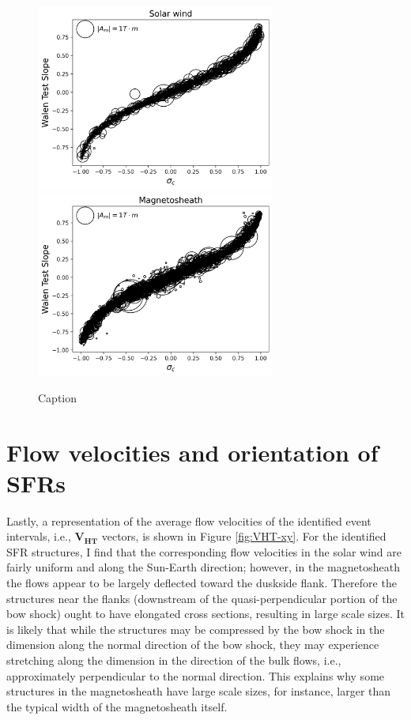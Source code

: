 \begin{figure}
    \centering
    \includegraphics[width=0.7\textwidth]{Figures/GS analysis/walenTest_vs_crosshelicity_solarwind.png}
    \includegraphics[width=0.7\textwidth]{Figures/GS analysis/walenTest_vs_crosshelicity_magnetosheath.png}
    \caption[Wal\'en test slope vs. reduced cross helicity]{Caption}
    \label{fig:walen-crosshelicity}
\end{figure}

\section{Flow velocities and orientation of SFRs}
Lastly, a representation of the average flow velocities of the identified event intervals, i.e., $\mathbf{V_{HT}}$ vectors, is shown in Figure \ref{fig:VHT-xy}. For the identified SFR structures, I find that the corresponding flow velocities in the solar wind are fairly uniform and along the Sun-Earth direction; however, in the magnetosheath the flows appear to be largely deflected toward the duskside flank. Therefore the structures near the flanks (downstream of the quasi-perpendicular portion of the bow shock) ought to have elongated cross sections, resulting in large scale sizes. It is likely that while the structures may be compressed by the bow shock in the dimension along the normal direction of the bow shock, they may experience stretching along the dimension in the direction of the bulk flows, i.e., approximately perpendicular to the normal direction. This explains why some structures in the magnetosheath have large scale sizes, for instance, larger than the typical width of the magnetosheath itself.

